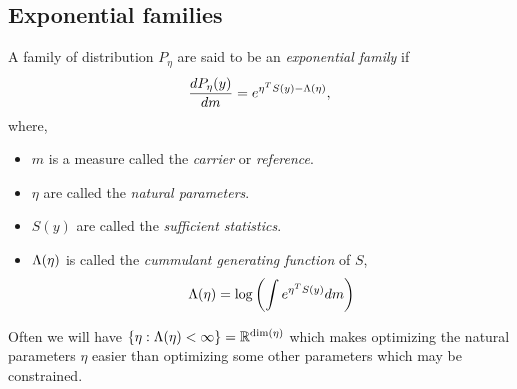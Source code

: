 \subsection{Exponential families}
A family of distribution $P_\eta$ are said to be an \emph{exponential family} if 
\[\frac{dP_\eta(y)}{dm} = e^{\eta^T S(y) - \Lambda(\eta)}, \]
where,
\begin{itemize}
    \item $m$ is a measure called the \emph{carrier} or \emph{reference}.
    \item $\eta$ are called the \emph{natural parameters}.
    \item $S(y)$ are called the \emph{sufficient statistics}.
    \item $\Lambda(\eta)$ is called the \emph{cummulant generating function} of $S$,
    \[\Lambda(\eta) = \log\left(\int e^{\eta^T S(y)}dm\right) \]
\end{itemize}
\begin{remark}
    Often we will have $\{\eta : \Lambda(\eta) < \infty\} = {\mathbb R}^{\dim(\eta)}$ which makes optimizing the natural parameters $\eta$ easier than optimizing some other parameters which may be constrained.
\end{remark}
